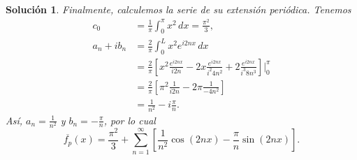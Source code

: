 \documentclass[11pt,letterpaper]{report}
\newtheorem*{sol}{Solución}
\newcommand\<{\langle}
\renewcommand\>{\rangle}
\begin{document}
\begin{sol}
  Finalmente, calculemos la serie de su extensión periódica.
  Tenemos
  \begin{align*}
    c_0
    &= \frac{1}{\pi}\int_{0}^{\pi}x^{2}\,dx = \frac{\pi^{2}}{3}, \\
    a_n+ib_n
    &= \frac{2}{\pi}\int_{0}^{L}x^{2}e^{i 2nx}\,dx \\
    &= \frac{2}{\pi} \left[
      x^{2}\frac{e^{i 2nx}}{i 2n}
      -2x\frac{e^{i 2nx}}{i^{2}4n^{2}}
      +2 \frac{e^{i 2nx}}{i^{3} 8n^{3}}
    \right]\Big|_{0}^{\pi} \\
   &= \frac{2}{\pi} \left[
     \pi^{2}\frac{1}{i 2n}
     -2\pi \frac{1}{-4n^{2}}
   \right] \\
   &= \frac{1}{n^{2}}-i \frac{\pi}{n}.
  \end{align*}
  Así, $a_n=\frac{1}{n^{2}}$ y $b_n=-\frac{\pi}{n}$, por lo cual
  \[
    \overline{f_p}(x)
    =
    \frac{\pi^{2}}{3}
    +
    \sum_{n=1}^{\infty} \left[
      \frac{1}{n^{2}}\cos(2nx)
      -
      \frac{\pi}{n}\sin(2nx)
    \right]
  .\]
\end{sol}
\end{document}
